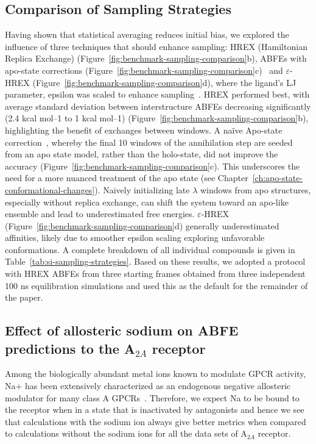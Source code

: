 \subsection{Comparison of Sampling Strategies}

Having shown that statistical averaging reduces initial bias, we explored the influence of three techniques that should enhance sampling: HREX (Hamiltonian Replica Exchange) (Figure~\ref{fig:benchmark-sampling-comparison}b), ABFEs with apo-state corrections (Figure~\ref{fig:benchmark-sampling-comparison}c)~\cite{cook2024challenges,liao2024method} and $\varepsilon$-HREX (Figure~\ref{fig:benchmark-sampling-comparison}d), where the ligand’s LJ parameter, epsilon was scaled to enhance sampling~\cite{baumann2021challenges}. HREX performed best, with average standard deviation between interstructure ABFEs decreasing significantly (2.4 kcal mol–1 to 1 kcal mol–1) (Figure~\ref{fig:benchmark-sampling-comparison}b), highlighting the benefit of exchanges between windows. A na\"ive Apo-state correction~\cite{cook2024challenges}, whereby the final 10 windows of the annihilation step are seeded from an apo state model, rather than the holo-state, did not improve the accuracy (Figure~\ref{fig:benchmark-sampling-comparison}c). This underscores the need for a more nuanced treatment of the apo state (see Chapter~\ref{ch:apo-state-conformational-changes}). Naively initializing late $\lambda$ windows from apo structures, especially without replica exchange, can shift the system toward an apo-like ensemble and lead to underestimated free energies. $\varepsilon$-HREX (Figure~\ref{fig:benchmark-sampling-comparison}d) generally underestimated affinities, likely due to smoother epsilon scaling exploring unfavorable conformations. A complete breakdown of all individual compounds is given in Table~\ref{tab:si-sampling-strategies}. Based on these results, we adopted a protocol with HREX ABFEs from three starting frames obtained from three independent 100 ns equilibration simulations and used this as the default for the remainder of the paper.
\subsection{Effect of allosteric sodium on ABFE predictions to the \texorpdfstring{A$_{2A}$}{A2A} receptor}

Among the biologically abundant metal ions known to modulate GPCR activity, Na+ has been extensively characterized as an endogenous negative allosteric modulator for many class A GPCRs~\cite{katritch2014allosteric}. Therefore, we expect Na to be bound to the receptor when in a state that is inactivated by antagonists and hence we see that calculations with the sodium ion always give better metrics when compared to calculations without the sodium ions for all the data sets of A$_{2A}$ receptor.

